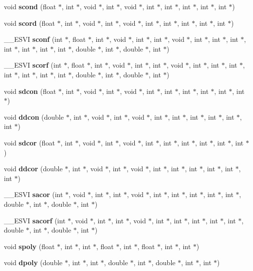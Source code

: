 \begin{CompactItemize}
\item 
void {\bf scond} (float $\ast$, int $\ast$, void $\ast$, int $\ast$, void $\ast$, int $\ast$, int $\ast$, int $\ast$, int $\ast$, int $\ast$)
\item 
void {\bf scord} (float $\ast$, int $\ast$, void $\ast$, int $\ast$, void $\ast$, int $\ast$, int $\ast$, int $\ast$, int $\ast$, int $\ast$)
\item 
\_\-\_\-ESVI {\bf sconf} (int $\ast$, float $\ast$, int $\ast$, void $\ast$, int $\ast$, int $\ast$, void $\ast$, int $\ast$, int $\ast$, int $\ast$, int $\ast$, int $\ast$, int $\ast$, int $\ast$, double $\ast$, int $\ast$, double $\ast$, int $\ast$)
\item 
\_\-\_\-ESVI {\bf scorf} (int $\ast$, float $\ast$, int $\ast$, void $\ast$, int $\ast$, int $\ast$, void $\ast$, int $\ast$, int $\ast$, int $\ast$, int $\ast$, int $\ast$, int $\ast$, int $\ast$, double $\ast$, int $\ast$, double $\ast$, int $\ast$)
\item 
void {\bf sdcon} (float $\ast$, int $\ast$, void $\ast$, int $\ast$, void $\ast$, int $\ast$, int $\ast$, int $\ast$, int $\ast$, int $\ast$, int $\ast$)
\item 
void {\bf ddcon} (double $\ast$, int $\ast$, void $\ast$, int $\ast$, void $\ast$, int $\ast$, int $\ast$, int $\ast$, int $\ast$, int $\ast$, int $\ast$)
\item 
void {\bf sdcor} (float $\ast$, int $\ast$, void $\ast$, int $\ast$, void $\ast$, int $\ast$, int $\ast$, int $\ast$, int $\ast$, int $\ast$, int $\ast$)
\item 
void {\bf ddcor} (double $\ast$, int $\ast$, void $\ast$, int $\ast$, void $\ast$, int $\ast$, int $\ast$, int $\ast$, int $\ast$, int $\ast$, int $\ast$)
\item 
\_\-\_\-ESVI {\bf sacor} (int $\ast$, void $\ast$, int $\ast$, int $\ast$, void $\ast$, int $\ast$, int $\ast$, int $\ast$, int $\ast$, int $\ast$, double $\ast$, int $\ast$, double $\ast$, int $\ast$)
\item 
\_\-\_\-ESVI {\bf sacorf} (int $\ast$, void $\ast$, int $\ast$, int $\ast$, void $\ast$, int $\ast$, int $\ast$, int $\ast$, int $\ast$, int $\ast$, double $\ast$, int $\ast$, double $\ast$, int $\ast$)
\item 
void {\bf spoly} (float $\ast$, int $\ast$, int $\ast$, float $\ast$, int $\ast$, float $\ast$, int $\ast$, int $\ast$)
\item 
void {\bf dpoly} (double $\ast$, int $\ast$, int $\ast$, double $\ast$, int $\ast$, double $\ast$, int $\ast$, int $\ast$)

\end{CompactItemize}
